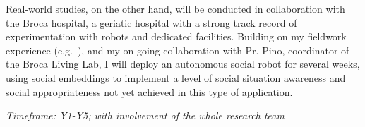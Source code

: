 Real-world studies, on the other hand, will be conducted in collaboration with
the Broca hospital, a geriatic hospital with a strong track record of
experimentation with robots and dedicated facilities.  Building on my
fieldwork
experience
(e.g.~\cite{hood2015when,mondada2015ranger,winkle2018social,cooper2023challenges}),
and my on-going collaboration with Pr. Pino, coordinator of the Broca Living Lab, I will
deploy an autonomous social robot for several weeks, using social embeddings to
implement a level of social situation awareness and social appropriateness not yet
achieved in this type of application.

\vspace{1em}
\noindent\emph{Timeframe: Y1-Y5; with involvement of the whole research team}

%
%
%

%
%

%
%
%
%



